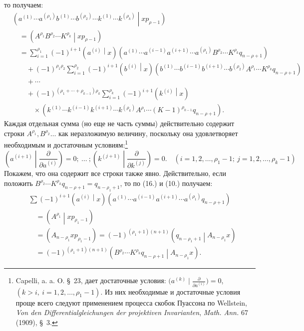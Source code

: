 \documentclass[11pt]{article}
\newcommand{\pair}[2]{\left(#1\middle|#2\right)}
\begin{document}
то получаем:
\[
\begin{aligned}
&\pair{a^{(1)}\cdots a^{(\rho_1)}b^{(1)}\cdots b^{(\rho_2)}
\cdots k^{(1)}\cdots k^{(\rho_k)}}{xp_{\rho-1}}\\
&\quad=\pair{A^{\rho_1}B^{\rho_2}\cdots K^{\rho_k}}{xp_{\rho-1}} \\
&\quad=\sum_{i=1}^{\rho_1}(-1)^{i+1}\pair{a^{(i)}}{x}
(a^{(1)}\cdots a^{(i-1)}a^{(i+1)}\cdots a^{(\rho_1)}
B^{\rho_2}\cdots K^{\rho_k}q_{n-\rho+1})\\
&\qquad+(-1)^{\rho_1\rho_2}\sum_{i=1}^{\rho_2}(-1)^{i+1}\pair{b^{(i)}}{x}
(b^{(1)}\cdots b^{(i-1)}b^{(i+1)}\cdots b^{(\rho_2)}
A^{\rho_1}\cdots K^{\rho_k}q_{n-\rho+1})\\
&\qquad+\cdots\\
&\qquad+(-1)^{(\rho_1+\cdots+\rho_{k-1})\rho_k}
\sum_{i=1}^{\rho_k}(-1)^{i+1}\pair{k^{(i)}}{x}\\
&\qquad\quad\times
(k^{(1)}\cdots k^{(i-1)}k^{(i+1)}\cdots k^{(\rho_k)}
A^{\rho_1}\cdots (K-1)^{\rho_{k-1}}q_{n-\rho+1}).
\end{aligned}
\]
Каждая отдельная сумма (но еще не часть суммы) действительно содержит строки $A^{\rho_1},B^{\rho_2}\ldots$ как неразложимую величину, поскольку она удовлетворяет необходимым и достаточным условиям:\footnote{Capelli, a. a. O. \S\ 23, дает достаточные условия: $\bigl(a^{(k)}\mid \frac{\partial}{\partial a^{(i)}}\bigr)=0$, $(k>i,\ i=1,2,\ldots,\rho_1-1)$. Из них необходимые и достаточные условия проще всего следуют применением процесса скобок Пуассона по Wellstein, \emph{Von den Differentialgleichungen der projektiven Invarianten}, \emph{Math. Ann.} 67 (1909), \S\ 3.}
\begin{equation}
 \left(a^{(i+1)}\middle|\frac{\partial}{\partial a^{(i)}}\right)=0;\ \ldots\ ;
 \left(k^{(j+1)}\middle|\frac{\partial}{\partial k^{(j)}}\right)=0.
 \quad (i=1,2,\ldots,\rho_1-1;\ j=1,2,\ldots,\rho_k-1)
\tag{19}
\end{equation}
Покажем, что она содержит все строки также явно. Действительно, если положить $B^{\rho_2}\cdots K^{\rho_k}q_{n-\rho+1}=q_{n-\rho_1+1}$, то по (16.) и (10.) получаем:
\[
\begin{aligned}
&\sum(-1)^{i+1}\pair{a^{(i)}}{x}
(a^{(1)}\cdots a^{(i-1)}a^{(i+1)}\cdots a^{(\rho_1)}q_{n-\rho+1})\\
&\quad=\pair{A^{\rho_1}}{xp_{\rho_1-1}}\\
&\quad=(A_{n-\rho_1}xp_{\rho_1-1})
=(-1)^{(\rho_1+1)(n+1)}\pair{q_{n-\rho_1+1}}{A_{n-\rho_1}x}\\
&\quad=(-1)^{(\rho_1+1)(n+1)}
\pair{B^{\rho_2}\cdots K^{\rho_k}q_{n-\rho+1}}{A_{n-\rho_1}x}.
\end{aligned}
\]
\end{document}
